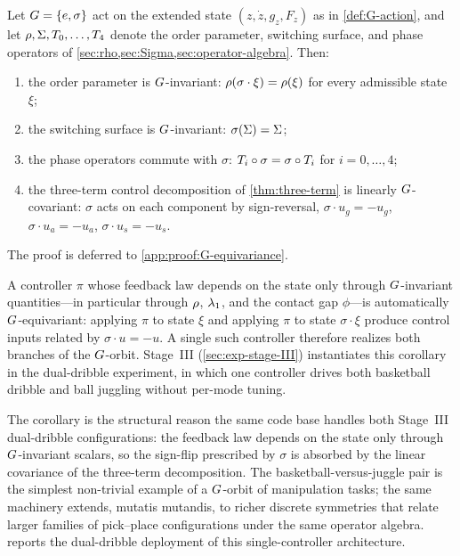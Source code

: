 \begin{lemma}
\label{lem:G-equivariance}
Let $G = \{e, \sigma\}$ act on the extended state
$(z, \dot z, g_{z}, F_{z})$ as in \cref{def:G-action}, and let
$\rho, \Sigma, T_{0}, \ldots, T_{4}$ denote
the order parameter, switching surface, and phase operators of
\cref{sec:rho,sec:Sigma,sec:operator-algebra}. Then:
\begin{enumerate}[label=(\roman*),nosep]
  \item the order parameter is $G$-invariant:
        $\rho(\sigma \cdot \xi) = \rho(\xi)$ for every
        admissible state $\xi$;
  \item the switching surface is $G$-invariant:
        $\sigma(\Sigma) = \Sigma$;
  \item the phase operators commute with $\sigma$:
        $T_{i} \circ \sigma = \sigma \circ T_{i}$ for
        $i = 0, \ldots, 4$;
  \item the three-term control decomposition of
        \cref{thm:three-term} is linearly $G$-covariant:
        $\sigma$ acts on each component by sign-reversal,
        $\sigma \cdot u_{g} = -u_{g}$,
        $\sigma \cdot u_{a} = -u_{a}$,
        $\sigma \cdot u_{s} = -u_{s}$.
\end{enumerate}
\end{lemma}

The proof is deferred to \cref{app:proof:G-equivariance}.

\begin{corollary}
\label{cor:G-controller}
A controller $\pi$ whose feedback law depends on the state only
through $G$-invariant quantities---in particular through
$\rho$, $\lambda_{1}$, and the contact gap $\phi$---is
automatically $G$-equivariant: applying $\pi$ to state
$\xi$ and applying $\pi$ to state $\sigma \cdot \xi$ produce
control inputs related by $\sigma \cdot u = -u$. A single such
controller therefore realizes both branches of the
$G$-orbit. Stage~III (\cref{sec:exp-stage-III})
instantiates this corollary in the dual-dribble experiment, in
which one controller drives both basketball dribble and ball
juggling without per-mode tuning.
\end{corollary}

The corollary is the structural reason the same code base
handles both Stage~III dual-dribble configurations: the feedback
law depends on the state only through $G$-invariant
scalars, so the sign-flip prescribed by $\sigma$ is absorbed by
the linear covariance of the three-term decomposition. The
basketball-versus-juggle pair is the simplest non-trivial example
of a $G$-orbit of manipulation tasks; the same machinery
extends, mutatis mutandis, to richer discrete symmetries that
relate larger families of pick--place configurations under the
same operator algebra.  reports the
dual-dribble deployment of this single-controller architecture.
